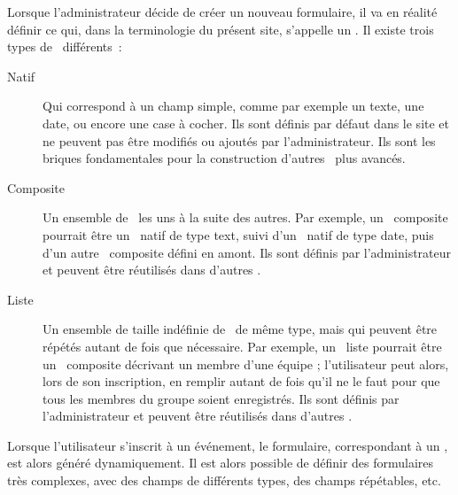 Lorsque l'administrateur décide de créer un nouveau formulaire, il va en réalité définir ce qui, dans la terminologie du présent site, s'appelle un \formwidget. Il existe trois types de \formwidget\ différents~:
\begin{description}
    \item[Natif] Qui correspond à un champ simple, comme par exemple un texte, une date, ou encore une case à cocher. Ils sont définis par défaut dans le site et ne peuvent pas être modifiés ou ajoutés par l'administrateur. Ils sont les briques fondamentales pour la construction d'autres \formwidget\ plus avancés.
    \item[Composite] Un ensemble de \formwidget\ les uns à la suite des autres. Par exemple, un \formwidget\ composite pourrait être un \formwidget\ natif de type text, suivi d'un \formwidget\ natif de type date, puis d'un autre \formwidget\ composite défini en amont. Ils sont définis par l'administrateur et peuvent être réutilisés dans d'autres \formwidget.
    \item[Liste] Un ensemble de taille indéfinie de \formwidget\ de même type, mais qui peuvent être répétés autant de fois que nécessaire. Par exemple, un \formwidget\ liste pourrait être un \formwidget\ composite décrivant un membre d'une équipe ; l'utilisateur peut alors, lors de son inscription, en remplir autant de fois qu'il ne le faut pour que tous les membres du groupe soient enregistrés. Ils sont définis par l'administrateur et peuvent être réutilisés dans d'autres \formwidget.
\end{description}

Lorsque l'utilisateur s'inscrit à un événement, le formulaire, correspondant à un \formwidget, est alors généré dynamiquement. Il est alors possible de définir des formulaires très complexes, avec des champs de différents types, des champs répétables, etc.
